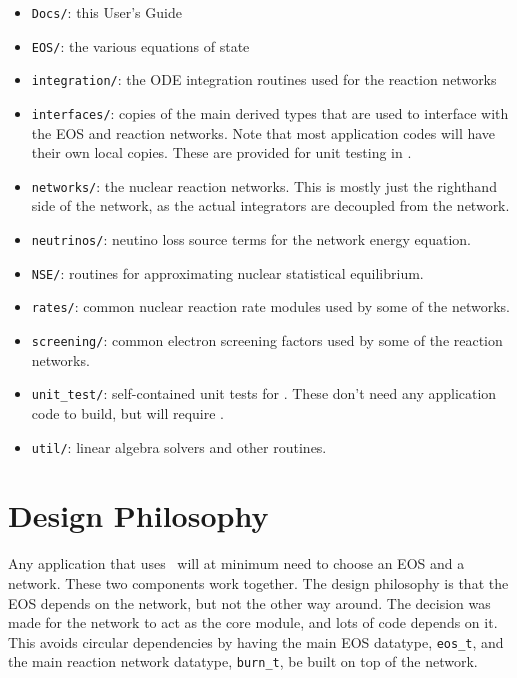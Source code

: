 \begin{itemize}
\item {\tt Docs/}: this User's Guide

\item {\tt EOS/}: the various equations of state

\item {\tt integration/}: the ODE integration routines used for the
  reaction networks

\item {\tt interfaces/}: copies of the main derived types that are used to
  interface with the EOS and reaction networks.  Note that most application
  codes will have their own local copies.  These are provided for unit testing
  in \microphysics.

\item {\tt networks/}: the nuclear reaction networks.  This is mostly just the
  righthand side of the network, as the actual integrators are decoupled from
  the network.

\item {\tt neutrinos/}: neutino loss source terms for the network energy equation.

\item {\tt NSE/}: routines for approximating nuclear statistical equilibrium.

\item {\tt rates/}: common nuclear reaction rate modules used by some of the 
  networks.

\item {\tt screening/}: common electron screening factors used by some of the 
  reaction networks.

\item {\tt unit\_test/}: self-contained unit tests for \microphysics.  These don't
  need any application code to build, but will require \amrex.

\item {\tt util/}: linear algebra solvers and other routines.

\end{itemize}



\section{Design Philosophy}

Any application that uses \microphysics\ will at minimum need to
choose an EOS and a network.  These two components work together.  The
design philosophy is that the EOS depends on the network, but not the
other way around.  The decision was made for the network to act as the
core module, and lots of code depends on it.  This avoids circular
dependencies by having the main EOS datatype, {\tt eos\_t}, and the
main reaction network datatype, {\tt burn\_t}, be built on top of the
network.

